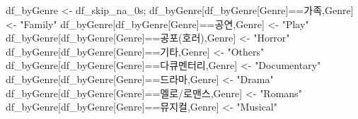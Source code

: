 \documentclass[
]{article}
\newenvironment{Shaded}{\begin{snugshade}}{\end{snugshade}}
\newcommand{\NormalTok}[1]{#1}
\newcommand{\OtherTok}[1]{\textcolor[rgb]{0.56,0.35,0.01}{#1}}
\newcommand{\SpecialCharTok}[1]{\textcolor[rgb]{0.00,0.00,0.00}{#1}}
\newcommand{\StringTok}[1]{\textcolor[rgb]{0.31,0.60,0.02}{#1}}
\begin{document}
\begin{Shaded}
\begin{Highlighting}[]
\NormalTok{df\_byGenre }\OtherTok{\textless{}{-}}\NormalTok{ df\_skip\_na\_0s;}
\NormalTok{df\_byGenre[df\_byGenre[}\StringTok{\textquotesingle{}Genre\textquotesingle{}}\NormalTok{]}\SpecialCharTok{==}\StringTok{\textquotesingle{}가족\textquotesingle{}}\NormalTok{,}\StringTok{\textquotesingle{}Genre\textquotesingle{}}\NormalTok{] }\OtherTok{\textless{}{-}} \StringTok{"Family"}
\NormalTok{df\_byGenre[df\_byGenre[}\StringTok{\textquotesingle{}Genre\textquotesingle{}}\NormalTok{]}\SpecialCharTok{==}\StringTok{\textquotesingle{}공연\textquotesingle{}}\NormalTok{,}\StringTok{\textquotesingle{}Genre\textquotesingle{}}\NormalTok{] }\OtherTok{\textless{}{-}} \StringTok{"Play"}
\NormalTok{df\_byGenre[df\_byGenre[}\StringTok{\textquotesingle{}Genre\textquotesingle{}}\NormalTok{]}\SpecialCharTok{==}\StringTok{\textquotesingle{}공포(호러)\textquotesingle{}}\NormalTok{,}\StringTok{\textquotesingle{}Genre\textquotesingle{}}\NormalTok{] }\OtherTok{\textless{}{-}} \StringTok{"Horror"}
\NormalTok{df\_byGenre[df\_byGenre[}\StringTok{\textquotesingle{}Genre\textquotesingle{}}\NormalTok{]}\SpecialCharTok{==}\StringTok{\textquotesingle{}기타\textquotesingle{}}\NormalTok{,}\StringTok{\textquotesingle{}Genre\textquotesingle{}}\NormalTok{] }\OtherTok{\textless{}{-}} \StringTok{"Others"}
\NormalTok{df\_byGenre[df\_byGenre[}\StringTok{\textquotesingle{}Genre\textquotesingle{}}\NormalTok{]}\SpecialCharTok{==}\StringTok{\textquotesingle{}다큐멘터리\textquotesingle{}}\NormalTok{,}\StringTok{\textquotesingle{}Genre\textquotesingle{}}\NormalTok{] }\OtherTok{\textless{}{-}} \StringTok{"Documentary"}
\NormalTok{df\_byGenre[df\_byGenre[}\StringTok{\textquotesingle{}Genre\textquotesingle{}}\NormalTok{]}\SpecialCharTok{==}\StringTok{\textquotesingle{}드라마\textquotesingle{}}\NormalTok{,}\StringTok{\textquotesingle{}Genre\textquotesingle{}}\NormalTok{] }\OtherTok{\textless{}{-}} \StringTok{"Drama"}
\NormalTok{df\_byGenre[df\_byGenre[}\StringTok{\textquotesingle{}Genre\textquotesingle{}}\NormalTok{]}\SpecialCharTok{==}\StringTok{\textquotesingle{}멜로/로맨스\textquotesingle{}}\NormalTok{,}\StringTok{\textquotesingle{}Genre\textquotesingle{}}\NormalTok{] }\OtherTok{\textless{}{-}} \StringTok{"Romans"}
\NormalTok{df\_byGenre[df\_byGenre[}\StringTok{\textquotesingle{}Genre\textquotesingle{}}\NormalTok{]}\SpecialCharTok{==}\StringTok{\textquotesingle{}뮤지컬\textquotesingle{}}\NormalTok{,}\StringTok{\textquotesingle{}Genre\textquotesingle{}}\NormalTok{] }\OtherTok{\textless{}{-}} \StringTok{"Musical"}

\end{Highlighting}
\end{Shaded}
\end{document}

